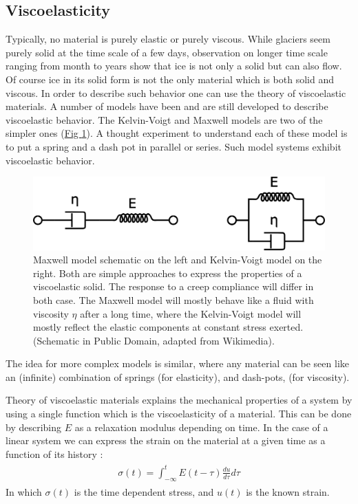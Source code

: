 \documentclass[A4paperpaper,11pt,english]{sphinxmanual}
\begin{document}
\subsection{Viscoelasticity}
\label{index-latex:viscoelasticity}
Typically, no material is purely elastic or purely viscous. While glaciers
seem purely solid at the time scale of a few days, observation on longer time
scale ranging from month to years show that ice is not only a
solid but can also flow. Of course ice in its solid form is not the only
material which is both solid and viscous. In order to describe such
behavior one can use the theory of viscoelastic materials.  A number of models have
been and are still developed to describe viscoelastic behavior. The
Kelvin-Voigt and Maxwell models are two of the simpler ones (\hyperref[index-latex:fig-mkv]{Fig  \ref*{index-latex:fig-mkv}}). A thought
experiment to understand each of these model is to put a spring and a dash pot
in parallel or series. Such model systems exhibit viscoelastic behavior.
\begin{figure}[htbp]
\centering
\capstart

\includegraphics[width=0.700\linewidth]{MKV.png}
\caption{Maxwell model schematic on the left and Kelvin-Voigt model on the right.
Both are simple approaches to express the properties of a viscoelastic
solid. The response to a creep compliance will differ in both case. The Maxwell
model will mostly behave like a fluid with viscosity \(\eta\) after a
long time, where the Kelvin-Voigt model will mostly reflect the elastic
components at constant stress exerted. (Schematic in Public Domain, adapted
from Wikimedia).}\label{index-latex:fig-mkv}\end{figure}

The idea for more complex models is similar, where any material can be seen like an
(infinite) combination of springs (for elasticity), and dash-pots, (for viscosity).

Theory of viscoelastic materials explains the mechanical properties of a system by
using a single function which is the viscoelasticity of a material. This can
be done by describing \(E\) as a relaxation modulus depending on time.  In
the case of a linear system we can express the strain on the material at a given
time as a function of its history :
\label{index-latex:equation-strain}\begin{gather}
\begin{split}\sigma (t)  = \int_{-\infty}^t E(t-\tau) \frac{du}{d\tau} d\tau\end{split}\label{index-latex-strain}
\end{gather}
In which \(\sigma(t)\) is the time dependent stress, and \(u(t)\) is
the known strain.
\end{document}
